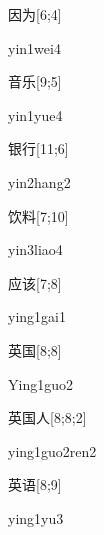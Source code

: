 \begin{verbete}{因为}[6;4]
\begin{pronuncia}{yin1wei4}
\end{pronuncia}
\end{verbete}

\begin{verbete}{音乐}[9;5]
\begin{pronuncia}{yin1yue4}
\end{pronuncia}
\end{verbete}

\begin{verbete}{银行}[11;6]
\begin{pronuncia}{yin2hang2}
\end{pronuncia}
\end{verbete}

\begin{verbete}{饮料}[7;10]
\begin{pronuncia}{yin3liao4}
\end{pronuncia}
\end{verbete}

\begin{verbete}{应该}[7;8]
\begin{pronuncia}{ying1gai1}
\end{pronuncia}
\end{verbete}

\begin{verbete}{英国}[8;8]
\begin{pronuncia}{Ying1guo2}
\end{pronuncia}
\end{verbete}

\begin{verbete}{英国人}[8;8;2]
\begin{pronuncia}{ying1guo2ren2}
\end{pronuncia}
\end{verbete}

\begin{verbete}[ying1yu3]{英语}[8;9]
\begin{pronuncia}{ying1yu3}
\end{pronuncia}
\end{verbete}


